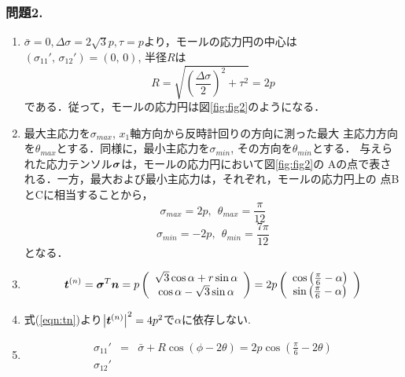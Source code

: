 \documentclass[10pt,a4j]{jarticle}
\begin{document}
\subsubsection*{問題2.}
\begin{enumerate}
\item
	$\bar{\sigma}=0, \Delta \sigma=2\sqrt{3}p, \tau = p$より，モールの応力円の中心は
	$(\sigma_{11}',\, \sigma_{12}')=(0,\, 0)$, 半径$R$は
	\begin{equation}
		R=\sqrt{\left(\frac{\Delta \sigma}{2}\right)^2+\tau ^2}=2p
		\label{neq:Radi}
	\end{equation}
	である．従って，モールの応力円は図\ref{fig:fig2}のようになる．
\item
	最大主応力を$\sigma_{max}$, $x_1$軸方向から反時計回りの方向に測った最大
	主応力方向を$\theta_{max}$とする．同様に，最小主応力を$\sigma_{min}$, 
	その方向を$\theta_{min}$とする．
	与えられた応力テンソル$\mbox{\boldmath $\sigma$}$は，モールの応力円において図\ref{fig:fig2}の
	Aの点で表される．一方，最大および最小主応力は，それぞれ，モールの応力円上の
	点BとCに相当することから，
	\begin{equation}
		\sigma_{max}=2p, \ \ \theta_{max}=\frac{\pi}{12}
	\end{equation}
	\begin{equation}
		\sigma_{min}=-2p, \ \ \theta_{min}=\frac{7\pi}{12}
	\end{equation}
	となる．
\item
	\begin{equation}
		\mbox{\boldmath $t$}^{(n)}
		=\mbox{\boldmath $\sigma$}^T\mbox{\boldmath $n$}
		=
		p
		\left( 
		\begin{array}{c}
			\sqrt{3} \cos\alpha +r\sin\alpha \\
			\cos\alpha - \sqrt{3} \sin\alpha 
		\end{array}
		\right)
		=
		2p
		\left( 
		\begin{array}{c}
			\cos\left(\frac{\pi}{6}-\alpha\right) \\
			\sin\left(\frac{\pi}{6}-\alpha\right) 
		\end{array}
		\right)
		\label{eqn:tn}
	\end{equation}
\item
	式(\ref{eqn:tn})より$\left| \mbox{\boldmath $t$}^{(n)}\right|^2=4p^2$で$\alpha$に依存しない.
\item
	\begin{eqnarray}
		\sigma_{11}'
		&=&\bar \sigma +R \cos \left( \phi- 2\theta \right)
		= 2p \cos \left( \frac{\pi}{6}-2\theta\right) 
		\label{eqn:s11d}
		\\
		\sigma_{12}'

\end{eqnarray}
\end{enumerate}
\end{document}
